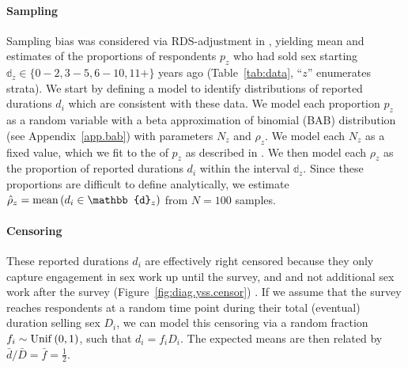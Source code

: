 \paragraph{Sampling}
Sampling bias was considered via RDS-adjustment in \cite{Baral2014},
yielding mean and \ci estimates of the proportions of respondents $p_z$
who had sold sex starting $\mathbb{d}_z \in \{0{-}2, 3{-}5, 6{-}10, 11+\}$ years ago
(Table~\ref{tab:data}, ``$z$'' enumerates strata).
We start by defining a model to identify distributions of reported durations $d_i$
which are consistent with these data.
We model each proportion $p_z$ as a random variable with
a beta approximation of binomial (BAB) distribution (see Appendix~\ref{app.bab})
with parameters $N_z$ and $\rho_z$.
We model each $N_z$ as a fixed value,
which we fit to the \ci of $p_z$ as described in .
We then model each $\rho_z$ as
the proportion of reported durations $d_i$ within the interval $\mathbb{d}_z$.
Since these proportions are difficult to define analytically,
we estimate $\hat{\rho}_z = \distr{mean}{d_i \in \mathbb{d}_z}$ from $N = 100$ samples.
\paragraph{Censoring}
These reported durations $d_i$ are effectively right censored
because they only capture engagement in sex work up until the survey, and
and not additional sex work after the survey
(Figure~\ref{fig:diag.yss.censor}) \cite{Fazito2012}.
If we assume that the survey reaches respondents at a random time point
during their total (eventual) duration selling sex $D_i$, we can model this censoring via
a random fraction $f_i \sim \mathrm{Unif}\,(0,1)$, such that $d_i = f_i D_i$.
The expected means are then related by $\bar{d} / \bar{D} = \bar{f} = \frac12$.

